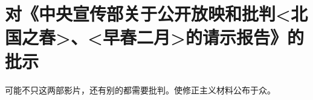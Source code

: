 \section[对《中央宣传部关于公开放映和批判<北国之春>、<早春二月>的请示报告》的批示（一九六四年八月）]{对《中央宣传部关于公开放映和批判<北国之春>、<早春二月>的请示报告》的批示}


可能不只这两部影片，还有别的都需要批判。使修正主义材料公布于众。 

